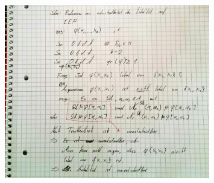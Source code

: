 \documentclass[12pt]{article}
\begin{document}
\begin{figure}[h]
 \centering
 \includegraphics[width=0.8\textwidth]{A3.jpg}
 \caption{}
 \label{}
\end{figure}

%         
%         
%   
%   
\end{document}

